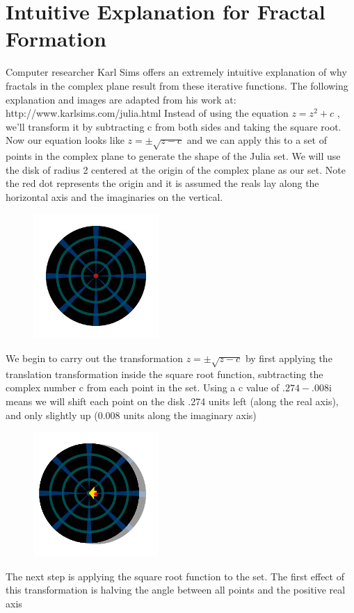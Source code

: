 \documentclass[12pt]{article}
\begin{document}
\section*{Intuitive  Explanation for Fractal Formation}
Computer researcher Karl Sims offers an extremely intuitive explanation of why fractals in the complex plane result from these iterative functions. The following explanation and images are adapted from his work at: http://www.karlsims.com/julia.html
Instead of using the equation $z=z^2+c$ , we'll transform it by subtracting c from both sides and taking the square root. Now our equation looks like $z=\pm\sqrt{z-c}$  and we can apply this to a set of points in the complex plane to generate the shape of the Julia set. We will use the disk of radius 2 centered at the origin of the complex plane as our set. Note the red dot represents the origin and it is assumed the reals lay along the horizontal axis and the imaginaries on the vertical.
\begin{figure}[H]
	\centering
	\includegraphics[width=0.2\linewidth]{images/julia0}
	\label{fig:rootEx2}
\end{figure}
We begin to carry out the transformation $z=\pm\sqrt{z-c}$ by first applying the translation transformation inside the square root function, subtracting the complex number c from each point in the set. Using a c value of $.274 - .008$i means we will shift each point on the disk .274 units left (along the real axis), and only slightly up (0.008 units along the imaginary axis)
\begin{figure}[H]
	\centering
	\includegraphics[width=0.2\linewidth]{images/julia1}
	\label{fig:rootEx2}
\end{figure}
The next step is applying the square root function to the set. The first effect of this transformation is halving the angle between all points and the positive real axis
\end{document}
